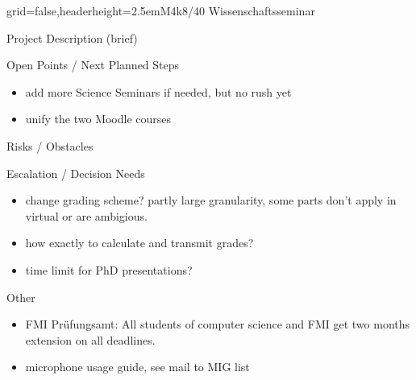 \documentclass[]{kiesgrube}
\begin{document}
\begin{poster}{grid=false,headerheight=2.5em}{}{M4k8/40 Wissenschaftsseminar}{}
\begin{posterbox}[name=description,column=1,row=0]{Project Description (brief)}
\end{posterbox}
\begin{posterbox}[name=open,column=1,below=description]{Open Points / Next Planned Steps}
\begin{itemize}
\item add more Science Seminars if needed, but no rush yet
\item unify the two Moodle courses
\end{itemize}
\end{posterbox}
\begin{posterbox}[name=risks,column=1,below=open]{Risks / Obstacles}
\end{posterbox}
\begin{posterbox}[name=escalation,column=1,below=risks]{Escalation / Decision Needs}
\begin{itemize}
\item change grading scheme? partly large granularity, some parts don't apply in virtual or are ambigious.
\item how exactly to calculate and transmit grades?
\item time limit for PhD presentations?
\end{itemize}
\end{posterbox}
\begin{posterbox}[name=other,column=1,below=escalation]{Other}
\begin{itemize}
\item FMI Prüfungsamt: All students of computer science and FMI get two months extension on all deadlines.
\item microphone usage guide, see mail to MIG list
\end{itemize}
\end{posterbox}
\end{poster}
\end{document}
